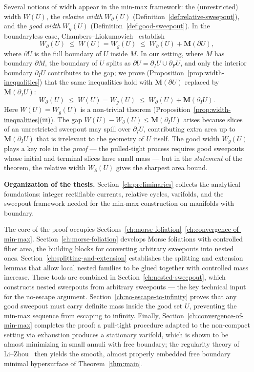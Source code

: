 \begin{remark}\label{rem:why-relative-width}
Several notions of width appear in the min-max framework: the (unrestricted) width $W(U)$, the \emph{relative width} $W_\partial(U)$ (Definition~\ref{def:relative-sweepout}), and the \emph{good width} $W_g(U)$ (Definition~\ref{def:good-sweepout}). In the boundaryless case, Chambers--Liokumovich~\cite{CL20} establish
\[
W_\partial(U) \;\leq\; W(U) = W_g(U) \;\leq\; W_\partial(U) + \mathbf{M}(\partial U),
\]
where $\partial U$ is the full boundary of $U$ inside $M$. In our setting, where $M$ has boundary $\partial M$, the boundary of $U$ splits as $\partial U = \partial_I U \cup \partial_F U$, and only the interior boundary $\partial_I U$ contributes to the gap; we prove (Proposition~\ref{prop:width-inequalities}) that the same inequalities hold with $\mathbf{M}(\partial U)$ replaced by $\mathbf{M}(\partial_I U)$:
\[
W_\partial(U) \;\leq\; W(U) = W_g(U) \;\leq\; W_\partial(U) + \mathbf{M}(\partial_I U).
\]
Here $W(U) = W_g(U)$ is a non-trivial theorem (Proposition~\ref{prop:width-inequalities}(iii)). The gap $W(U) - W_\partial(U) \leq \mathbf{M}(\partial_I U)$ arises because slices of an unrestricted sweepout may spill over $\partial_I U$, contributing extra area up to $\mathbf{M}(\partial_I U)$ that is irrelevant to the geometry of $U$ itself. The good width $W_g(U)$ plays a key role in the \emph{proof} --- the pulled-tight process requires good sweepouts whose initial and terminal slices have small mass --- but in the \emph{statement} of the theorem, the relative width $W_\partial(U)$ gives the sharpest area bound.
\end{remark}

\medskip
\noindent\textbf{Organization of the thesis.}
Section~\ref{ch:preliminaries} collects the analytical foundations: integer rectifiable currents, relative cycles, varifolds, and the sweepout framework needed for the min-max construction on manifolds with boundary.

The core of the proof occupies Sections~\ref{ch:morse-foliation}--\ref{ch:convergence-of-min-max}. Section~\ref{ch:morse-foliation} develops Morse foliations with controlled fiber area, the building blocks for converting arbitrary sweepouts into nested ones. Section~\ref{ch:splitting-and-extension} establishes the splitting and extension lemmas that allow local nested families to be glued together with controlled mass increase. These tools are combined in Section~\ref{ch:nested-sweepout}, which constructs nested sweepouts from arbitrary sweepouts --- the key technical input for the no-escape argument. Section~\ref{ch:no-escape-to-infinity} proves that any good sweepout must carry definite mass inside the good set $U$, preventing the min-max sequence from escaping to infinity. Finally, Section~\ref{ch:convergence-of-min-max} completes the proof: a pull-tight procedure adapted to the non-compact setting via exhaustion produces a stationary varifold, which is shown to be almost minimizing in small annuli with free boundary; the regularity theory of Li--Zhou~\cite{LZ17} then yields the smooth, almost properly embedded free boundary minimal hypersurface of Theorem~\ref{thm:main}.